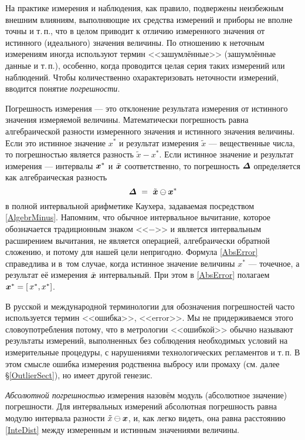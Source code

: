 \documentclass[a5paper,openany]{book}
\newcommand{\mbf}[1]{\protect\text{\boldmath$#1$}}
\begin{document}
    
На практике измерения и наблюдения, как правило, подвержены неизбежным внешним влияниям, 
выполняющие их средства измерений и приборы не вполне точны и т.\,п., что в целом 
приводит к отличию измеренного значения от истинного (идеального) значения величины. 
По отношению к неточным измерениям иногда используют термин <<зашумлённые>> (зашумлённые 
данные и т.\,п.), особенно, когда проводится целая серия таких измерений или наблюдений. 
Чтобы  количественно охарактеризовать неточности измерений, вводится понятие 
\emph{погрешности}. 
  
Погрешность измерения --- это отклонение результата измерения от истинного значения 
измеряемой величины. Математически погрешность равна алгебраической разности 
измеренного значения и истинного значения величины. Если это истинное значение $x^\ast$ 
и результат измерения $\tilde{x}$ --- вещественные числа, то погрешностью является 
разность $\tilde{x} - x^{\ast}$. Если истинное значение и результат измерения --- 
интервалы $\mbf{x}^{\ast}$ и $\tilde{\mbf{x}}$ соответственно, то погрешность 
$\mbf{\varDelta}$ определяется как алгебраичес\-кая разность 
\begin{equation} 
\label{AbsError} 
\mbf{\varDelta} \  = \  \tilde{\mbf{x}}\ominus\mbf{x}^{\ast}
\end{equation}
в полной интервальной арифметике Каухера, задаваемая посредством \eqref{AlgebrMinus}. 
Напомним, что обычное интервальное вычитание, которое обозначается традиционным 
знаком <<$-$>> и является интервальным расширением вычитания, не является операцией, 
алгебраически обратной сложению, и потому для нашей цели непригодно. Формула 
\eqref{AbsError} справедлива и в~том случае, когда истинное значение величины 
$x^{\ast}$ --- точечное, а результат её измерения $\tilde{\mbf{x}}$ интервальный. 
При этом в \eqref{AbsError} полагаем $\mbf{x}^{\ast} = [\,x^{\ast}, x^{\ast}]$. 
  
В русской и международной терминологии для обозначения погрешностей часто используется 
термин <<ошибка>>, <<error>>. Мы не придерживаемся этого словоупотребления потому, что 
в метрологии <<ошибкой>> обычно называют результаты измерений, выполненных без соблюдения 
необходимых условий на измерительные процедуры, с нарушениями технологических регламентов 
и т.\,п. В этом смысле ошибка измерения родственна выбросу или промаху (см. далее 
\S\ref{OutlierSect}), но имеет другой генезис.                   
  
\textit{Абсолютной погрешностью} измерения назовём модуль (абсолютное значение) 
погрешности. Для интервальных измерений абсолютная погрешность равна модулю интервала 
разности $\tilde{x}\ominus\mbf{x}$, и, как легко видеть, она равна расстоянию 
\eqref{InteDist} между измеренным и истинным значениями величины. 
  
\end{document}
